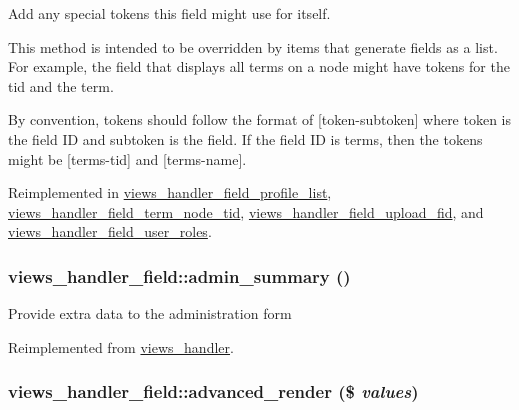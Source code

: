 Add any special tokens this field might use for itself.

This method is intended to be overridden by items that generate fields as a list. For example, the field that displays all terms on a node might have tokens for the tid and the term.

By convention, tokens should follow the format of \mbox{[}token-subtoken\mbox{]} where token is the field ID and subtoken is the field. If the field ID is terms, then the tokens might be \mbox{[}terms-tid\mbox{]} and \mbox{[}terms-name\mbox{]}. 

Reimplemented in \hyperlink{classviews__handler__field__profile__list_411c5238debac02e7cb3f582f7cd8e9f}{views\_\-handler\_\-field\_\-profile\_\-list}, \hyperlink{classviews__handler__field__term__node__tid_7fea3443ab075e3e35212ddc3b0d95f3}{views\_\-handler\_\-field\_\-term\_\-node\_\-tid}, \hyperlink{classviews__handler__field__upload__fid_0366e80867739ae07af5ee910d3022be}{views\_\-handler\_\-field\_\-upload\_\-fid}, and \hyperlink{classviews__handler__field__user__roles_ceb9ebe1ca046eec3634c85bb6b114f5}{views\_\-handler\_\-field\_\-user\_\-roles}.\hypertarget{classviews__handler__field_984d6ce9f6401260fca2d4673b27ae76}{
\subsubsection[{admin\_\-summary}]{\setlength{\rightskip}{0pt plus 5cm}views\_\-handler\_\-field::admin\_\-summary ()}}
\label{classviews__handler__field_984d6ce9f6401260fca2d4673b27ae76}


Provide extra data to the administration form 

Reimplemented from \hyperlink{classviews__handler_27a5cb35f3f17322957730a95b6be11e}{views\_\-handler}.\hypertarget{classviews__handler__field_eaf2c6f1ad7afa813ba64de4be3ecd58}{
\subsubsection[{advanced\_\-render}]{\setlength{\rightskip}{0pt plus 5cm}views\_\-handler\_\-field::advanced\_\-render (\$ {\em values})}}
\label{classviews__handler__field_eaf2c6f1ad7afa813ba64de4be3ecd58}


